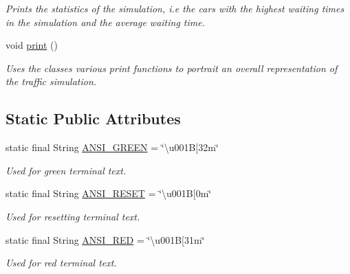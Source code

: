 \begin{DoxyCompactItemize}
\begin{DoxyCompactList}\small\item\em Prints the statistics of the simulation, i.\+e the cars with the highest waiting times in the simulation and the average waiting time. \end{DoxyCompactList}\item 
\hypertarget{class_traffic_system_ab747eb58cd5d7aeb3d3b4a0d73939ce2}{void \hyperlink{class_traffic_system_ab747eb58cd5d7aeb3d3b4a0d73939ce2}{print} ()}\label{class_traffic_system_ab747eb58cd5d7aeb3d3b4a0d73939ce2}

\begin{DoxyCompactList}\small\item\em Uses the classes various print functions to portrait an overall representation of the traffic simulation. \end{DoxyCompactList}\end{DoxyCompactItemize}
\subsection*{Static Public Attributes}
\begin{DoxyCompactItemize}
\item 
\hypertarget{class_traffic_system_a35f1a6efe35d73a4e4d296ca557f12b4}{static final String \hyperlink{class_traffic_system_a35f1a6efe35d73a4e4d296ca557f12b4}{A\+N\+S\+I\+\_\+\+G\+R\+E\+E\+N} = \char`\"{}\textbackslash{}u001\+B\mbox{[}32m\char`\"{}}\label{class_traffic_system_a35f1a6efe35d73a4e4d296ca557f12b4}

\begin{DoxyCompactList}\small\item\em Used for green terminal text. \end{DoxyCompactList}\item 
\hypertarget{class_traffic_system_a4f8a678e9b5444b353f2932a38206e62}{static final String \hyperlink{class_traffic_system_a4f8a678e9b5444b353f2932a38206e62}{A\+N\+S\+I\+\_\+\+R\+E\+S\+E\+T} = \char`\"{}\textbackslash{}u001\+B\mbox{[}0m\char`\"{}}\label{class_traffic_system_a4f8a678e9b5444b353f2932a38206e62}

\begin{DoxyCompactList}\small\item\em Used for resetting terminal text. \end{DoxyCompactList}\item 
\hypertarget{class_traffic_system_a312857e0f0a7bf49c668d15d7c7d85fa}{static final String \hyperlink{class_traffic_system_a312857e0f0a7bf49c668d15d7c7d85fa}{A\+N\+S\+I\+\_\+\+R\+E\+D} = \char`\"{}\textbackslash{}u001\+B\mbox{[}31m\char`\"{}}\label{class_traffic_system_a312857e0f0a7bf49c668d15d7c7d85fa}

\begin{DoxyCompactList}\small\item\em Used for red terminal text. \end{DoxyCompactList}\end{DoxyCompactItemize}



